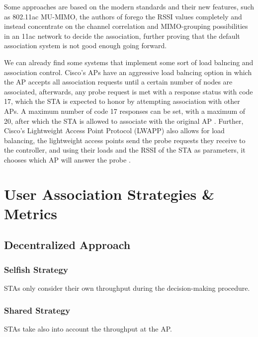 \documentclass{article}
\begin{document}
	Some approaches are based on the modern standards and their new features, such as 802.11ac MU-MIMO, the authors of \cite{mimo2017} forego the RSSI values completely and instead concentrate on the channel correlation and MIMO-grouping possibilities in an 11ac network to decide the association, further proving that the default association system is not good enough going forward.
	
We can already find some systems that implement some sort of load balncing and association control. Cisco's APs have an aggressive load balncing option in which the AP accepts all association requests until a certain number of nodes are associated, afterwards, any probe request is met with a response status with code 17, which the STA is expected to honor by attempting association with other APs. A maximum number of code 17 responses can be set, with a maximum of 20, after which the STA is allowed to associate with the original AP \cite{cisco2017}. Further, Cisco's Lightweight Access Point Protocol (LWAPP) also allows for load balancing, the lightweight access points send the probe requests they receive to the controller, and using their loads and the RSSI of the STA as parameters, it chooses which AP will answer the probe \cite{cisco2006}.
	
	
	
	
\section{User Association Strategies \& Metrics}
\label{section:strategies}

	\subsection{Decentralized Approach}
	\label{section:decentralized}
	
		\subsubsection{Selfish Strategy}
		\label{section:selfish}
			STAs only consider their own throughput during the decision-making procedure.
			
		\subsubsection{Shared Strategy}
		\label{section:shared}
			STAs take also into account the throughput at the AP.
	
\end{document}
